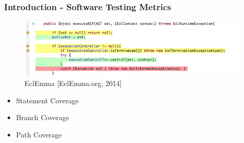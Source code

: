\begin{frame}
\frametitle{Introduction - Software Testing Metrics}
	\begin{figure}
		\centering
		\includegraphics[width=0.758\linewidth]{figures/EclEmma}
		\caption{EclEmma [EclEmma.org, 2014]}
	\end{figure}
	\begin{itemize}
	\item Statement Coverage
	\item Branch Coverage
	\item Path Coverage
	\end{itemize}
\end{frame}

%  

